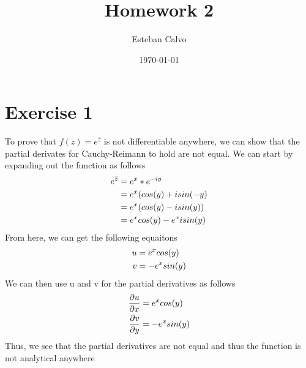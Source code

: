 \documentclass[notitlepage]{article}
\newcommand{\HwBreak}{%
  \par\noindent\makebox[\linewidth]{\rule{0.9\paperwidth}{0.4pt}}\par%
}
\begin{document}
  
\title{Homework 2}
\author{Esteban Calvo}
\date{\isodate\today}

\maketitle

\newpage
\section*{Exercise 1}
    To prove that $f(z)=e^{\bar{z}}$ is not differentiable anywhere, we can show that the partial derivates for Cauchy-Reimann to hold are not equal. 
    We can start by expanding out the function as follows
   \begin{equation}
    \begin{aligned}
        e^{\bar{z}} &= e^x*e^{-iy} \notag \\
                    &= e^x(cos(y)+isin(-y) \\
                    &= e^x(cos(y)-isin(y)) \\
                    &= e^xcos(y) - e^xisin(y)
    \end{aligned}
\end{equation}
    From here, we can get the following equaitons
\begin{equation}
    \begin{aligned}
                u   &= e^xcos(y) \notag\\
                v   &= -e^xsin(y)
    \end{aligned}
\end{equation}
    We can then use u and v for the partial derivatives as follows
\begin{equation}
    \begin{aligned}
        \frac{\partial u}{\partial x} &= e^xcos(y)\notag \\
        \frac{\partial v}{\partial y} &= -e^xsin(y)
    \end{aligned}
\end{equation}
    Thus, we see that the partial derivatives are not equal and thus the function is not analytical anywhere \\~\\

\HwBreak
\end{document}
